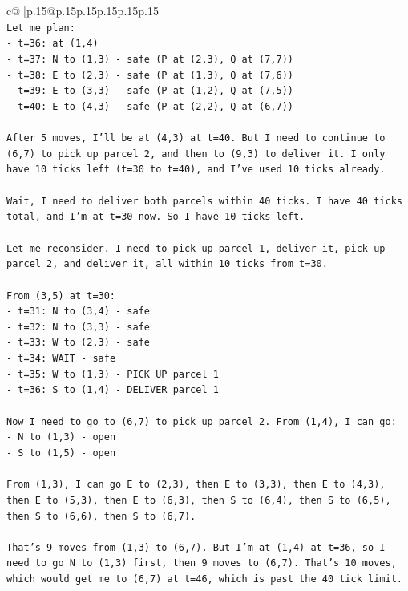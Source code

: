 \documentclass{article}
\begin{document}
{\begin{supertabular}{c@{$\;$}|p{.15\linewidth}@{}p{.15\linewidth}p{.15\linewidth}p{.15\linewidth}p{.15\linewidth}p{.15\linewidth}}
{{{\\ 
\texttt{Let me plan:} \\
\texttt{{-} t=36: at (1,4)} \\
\texttt{{-} t=37: N to (1,3) {-} safe (P at (2,3), Q at (7,7))} \\
\texttt{{-} t=38: E to (2,3) {-} safe (P at (1,3), Q at (7,6))} \\
\texttt{{-} t=39: E to (3,3) {-} safe (P at (1,2), Q at (7,5))} \\
\texttt{{-} t=40: E to (4,3) {-} safe (P at (2,2), Q at (6,7))} \\
\\ 
\texttt{After 5 moves, I'll be at (4,3) at t=40. But I need to continue to (6,7) to pick up parcel 2, and then to (9,3) to deliver it. I only have 10 ticks left (t=30 to t=40), and I've used 10 ticks already.} \\
\\ 
\texttt{Wait, I need to deliver both parcels within 40 ticks. I have 40 ticks total, and I'm at t=30 now. So I have 10 ticks left.} \\
\\ 
\texttt{Let me reconsider. I need to pick up parcel 1, deliver it, pick up parcel 2, and deliver it, all within 10 ticks from t=30.} \\
\\ 
\texttt{From (3,5) at t=30:} \\
\texttt{{-} t=31: N to (3,4) {-} safe} \\
\texttt{{-} t=32: N to (3,3) {-} safe} \\
\texttt{{-} t=33: W to (2,3) {-} safe} \\
\texttt{{-} t=34: WAIT {-} safe} \\
\texttt{{-} t=35: W to (1,3) {-} PICK UP parcel 1} \\
\texttt{{-} t=36: S to (1,4) {-} DELIVER parcel 1} \\
\\ 
\texttt{Now I need to go to (6,7) to pick up parcel 2. From (1,4), I can go:} \\
\texttt{{-} N to (1,3) {-} open} \\
\texttt{{-} S to (1,5) {-} open} \\
\\ 
\texttt{From (1,3), I can go E to (2,3), then E to (3,3), then E to (4,3), then E to (5,3), then E to (6,3), then S to (6,4), then S to (6,5), then S to (6,6), then S to (6,7).} \\
\\ 
\texttt{That's 9 moves from (1,3) to (6,7). But I'm at (1,4) at t=36, so I need to go N to (1,3) first, then 9 moves to (6,7). That's 10 moves, which would get me to (6,7) at t=46, which is past the 40 tick limit.} \\
}}}
\end{supertabular}}
\end{document}
